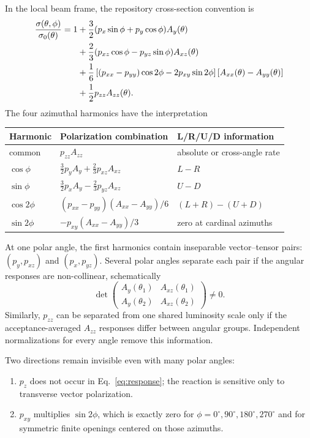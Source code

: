 \documentclass[11pt,a4paper]{article}
\begin{document}
In the local beam frame, the repository cross-section convention is
\begin{align}
 \frac{\sigma(\theta,\phi)}{\sigma_0(\theta)}=1
 &+\frac32(p_x\sin\phi+p_y\cos\phi)A_y(\theta)\notag\\
 &+\frac23(p_{xz}\cos\phi-p_{yz}\sin\phi)A_{xz}(\theta)\notag\\
 &+\frac16\left[(p_{xx}-p_{yy})\cos2\phi
 -2p_{xy}\sin2\phi\right][A_{xx}(\theta)-A_{yy}(\theta)]\notag\\
 &+\frac12p_{zz}A_{zz}(\theta).
 \label{eq:response}
\end{align}
The four azimuthal harmonics have the interpretation
\begin{center}
\begin{tabular}{lll}
\toprule
Harmonic & Polarization combination & L/R/U/D information\\
\midrule
common & $p_{zz}A_{zz}$ & absolute or cross-angle rate\\
$\cos\phi$ & $\frac32p_yA_y+\frac23p_{xz}A_{xz}$ & $L-R$\\
$\sin\phi$ & $\frac32p_xA_y-\frac23p_{yz}A_{xz}$ & $U-D$\\
$\cos2\phi$ & $(p_{xx}-p_{yy})(A_{xx}-A_{yy})/6$ & $(L+R)-(U+D)$\\
$\sin2\phi$ & $-p_{xy}(A_{xx}-A_{yy})/3$ & zero at cardinal azimuths\\
\bottomrule
\end{tabular}
\end{center}

At one polar angle, the first harmonics contain inseparable vector--tensor pairs:
$(p_y,p_{xz})$ and $(p_x,p_{yz})$.  Several polar angles separate each pair if
the angular responses are non-collinear, schematically
\begin{equation}
 \det
 \begin{pmatrix}
 A_y(\theta_1)&A_{xz}(\theta_1)\\
 A_y(\theta_2)&A_{xz}(\theta_2)
 \end{pmatrix}\neq0.
 \label{eq:first-harmonic-condition}
\end{equation}
Similarly, $p_{zz}$ can be separated from one shared luminosity scale only if the
acceptance-averaged $A_{zz}$ responses differ between angular groups.  Independent
normalizations for every angle remove this information.

Two directions remain invisible even with many polar angles:
\begin{enumerate}
 \item $p_z$ does not occur in Eq.~\eqref{eq:response}; the reaction is sensitive
 only to transverse vector polarization.
 \item $p_{xy}$ multiplies $\sin2\phi$, which is exactly zero for
 $\phi=0^\circ,90^\circ,180^\circ,270^\circ$ and for symmetric finite openings
 centered on those azimuths.
\end{enumerate}
\end{document}
